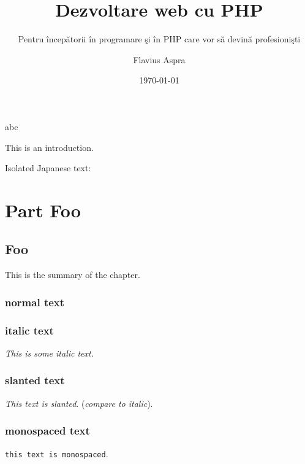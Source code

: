 \documentclass[a4paper,12pt,fleqn,twoside,openright,style=phpro]{yapbook}
\title{Dezvoltare web cu PHP}
\subtitle{Pentru începătorii în programare şi în PHP care vor să devină profesionişti}
\author{Flavius Aspra}
\date{\today}
\begin{document}
\frontmatter

    \maketitle

    abc

    \tableofcontents


        This is an introduction.

        Isolated Japanese text: 

\mainmatter

    \part{Part Foo}

        \chapter{Foo}
            \begin{chapsummary}
            This is the summary
            of the chapter.

            \lipsum[1]

            \end{chapsummary}

            \lipsum[1]

            \section{normal text}

            \section{italic text}
            \textit{This is some italic text.}

            \section{slanted text}
            \textsl{This text is slanted}. (\textit{compare to italic}).

            \section{monospaced text}
            \texttt{this text is monospaced}.
\end{document}
